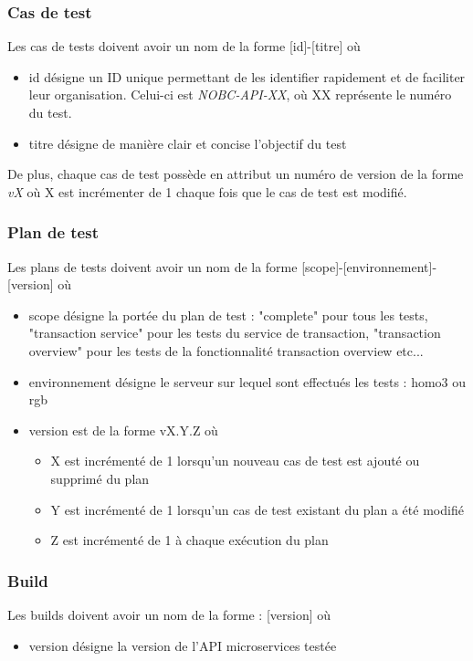 	\subsubsection*{Cas de test}
	Les cas de tests doivent avoir un nom de la forme [id]-[titre] où
	\begin{itemize}
		\item id désigne un ID unique permettant de les identifier rapidement et de faciliter leur organisation. Celui-ci est \textit{NOBC-API-XX}, où XX représente le numéro du test. 
		\item titre désigne de manière clair et concise l'objectif du test
	\end{itemize}		
	De plus, chaque cas de test possède en attribut un numéro de version de la forme \textit{vX} où X est incrémenter de 1 chaque fois que le cas de test est modifié.
	
	\subsubsection*{Plan de test}
	Les plans de tests doivent avoir un nom de la forme [scope]-[environnement]-[version] où
	\begin{itemize}
		\item scope désigne la portée du plan de test : "complete" pour tous les tests, "transaction service" pour les tests du service de transaction, "transaction overview" pour les tests de la fonctionnalité transaction overview etc...
		\item environnement désigne le serveur sur lequel sont effectués les tests : homo3 ou rgb
		\item version est de la forme vX.Y.Z où
			\begin{itemize}
				\item X est incrémenté de 1 lorsqu'un nouveau cas de test est ajouté ou supprimé du plan
				\item Y est incrémenté de 1 lorsqu'un cas de test existant du plan a été modifié
				\item Z est incrémenté de 1 à chaque exécution du plan
			\end{itemize}
	\end{itemize}
	
	\subsubsection*{Build}
	Les builds doivent avoir un nom de la forme : [version] où
	\begin{itemize}
		\item version désigne la version de l'API microservices testée \\
	\end{itemize}
	
